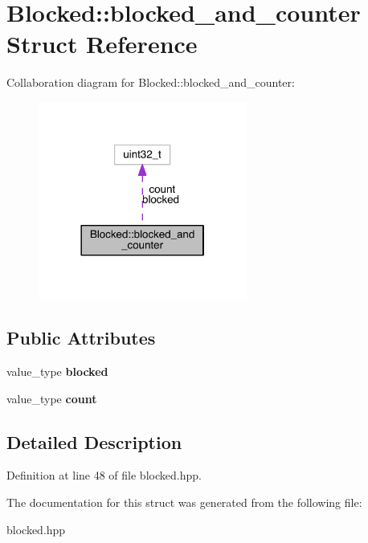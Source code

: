 \hypertarget{struct_blocked_1_1blocked__and__counter}{}\section{Blocked\+:\+:blocked\+\_\+and\+\_\+counter Struct Reference}
\label{struct_blocked_1_1blocked__and__counter}


Collaboration diagram for Blocked\+:\+:blocked\+\_\+and\+\_\+counter\+:
\nopagebreak
\begin{figure}[H]
\begin{center}
\leavevmode
\includegraphics[width=194pt]{struct_blocked_1_1blocked__and__counter__coll__graph}
\end{center}
\end{figure}
\subsection*{Public Attributes}
\begin{DoxyCompactItemize}
\item 
\hypertarget{struct_blocked_1_1blocked__and__counter_adbdd8f50a31d16dab89bc0525881cbb5}{}\label{struct_blocked_1_1blocked__and__counter_adbdd8f50a31d16dab89bc0525881cbb5} 
value\+\_\+type {\bfseries blocked}
\item 
\hypertarget{struct_blocked_1_1blocked__and__counter_a926f029d3834d74776188aaf4aa8de7c}{}\label{struct_blocked_1_1blocked__and__counter_a926f029d3834d74776188aaf4aa8de7c} 
value\+\_\+type {\bfseries count}
\end{DoxyCompactItemize}


\subsection{Detailed Description}


Definition at line 48 of file blocked.\+hpp.



The documentation for this struct was generated from the following file\+:\begin{DoxyCompactItemize}
\item 
blocked.\+hpp\end{DoxyCompactItemize}
